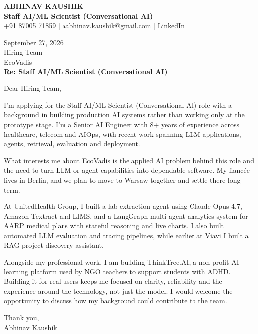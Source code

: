 \documentclass[10pt,a4paper]{article}
\begin{document}
\begin{center}
{\Large\bfseries ABHINAV KAUSHIK}\\[2pt]
{\bfseries Staff AI/ML Scientist (Conversational AI)}\\[2pt]
+91 87005 71859 \quad | \quad aabhinav.kaushik@gmail.com \quad | \quad LinkedIn
\end{center}
\vspace{8pt}
September 27, 2026\\[6pt]
Hiring Team\\
EcoVadis\\[4pt]
\textbf{Re: Staff AI/ML Scientist (Conversational AI)}

Dear Hiring Team,

I’m applying for the Staff AI/ML Scientist (Conversational AI) role with a background in building production AI systems rather than working only at the prototype stage. I’m a Senior AI Engineer with 8+ years of experience across healthcare, telecom and AIOps, with recent work spanning LLM applications, agents, retrieval, evaluation and deployment.

What interests me about EcoVadis is the applied AI problem behind this role and the need to turn LLM or agent capabilities into dependable software. My fiancée lives in Berlin, and we plan to move to Warsaw together and settle there long term.

At UnitedHealth Group, I built a lab-extraction agent using Claude Opus 4.7, Amazon Textract and LIMS, and a LangGraph multi-agent analytics system for AARP medical plans with stateful reasoning and live charts. I also built automated LLM evaluation and tracing pipelines, while earlier at Viavi I built a RAG project discovery assistant.

Alongside my professional work, I am building ThinkTree.AI, a non-profit AI learning platform used by NGO teachers to support students with ADHD. Building it for real users keeps me focused on clarity, reliability and the experience around the technology, not just the model. I would welcome the opportunity to discuss how my background could contribute to the team.

Thank you,\\
Abhinav Kaushik
\end{document}
